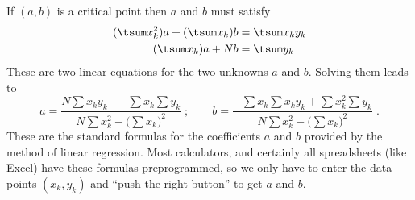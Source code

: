 If $(a,b)$ is a critical point then $a$ and $b$ must satisfy
\begin{align*}
  (\tsum x_k^2) a + (\tsum x_k) b &= \tsum x_ky_k \\
  (\tsum x_k) a + N b &= \tsum y_k
\end{align*}
These are two linear equations for the two unknowns $a$ and $b$.  Solving them
leads to
\[
a = \frac{N\sum x_ky_k \; - \; \sum x_k \sum y_k} {N\sum x_k^2 - \bigl(\sum
  x_k\bigr)^2}\; ; \qquad b = \frac{-\sum x_k \sum x_ky_k + \sum x_k^2 \sum y_k}
{N\sum x_k^2 - \bigl(\sum x_k\bigr)^2}\; .
\]
These are the standard formulas for the coefficients $a$ and $b$ provided by the
method of linear regression.  Most calculators, and certainly all spreadsheets
(like Excel) have these formulas preprogrammed, so we only have to enter the
data points $(x_k,y_k)$ and ``push the right button'' to get $a$ and $b$.

